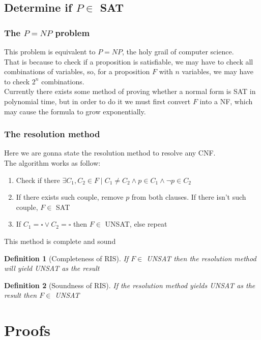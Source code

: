\documentclass{report}
\newtheorem{definition}{Definition}[section]
\begin{document}
    \section{Determine if $P \in$ SAT}
        \subsection{The $P = NP$ problem}
            This problem is equivalent to $P = NP$, the holy grail of computer science. \\
            That is because to check if a proposition is satisfiable, we may have to check 
            all combinations of variables, so, for a proposition $F$ with $n$ variables, we 
            may have to check $2^n$ combinations. \\
            Currently there exists some method of proving whether a normal form is SAT in 
            polynomial time, but in order to do it we must first convert $F$ into a NF, 
            which may cause the formula to grow exponentially.
        \subsection{The resolution method}
            Here we are gonna state the resolution method to resolve any CNF. \\
            The algorithm works as follow:
            \begin{enumerate}
                \item Check if there $\exists C_1, C_2 \in F \mid C_1 \neq C_2 \land p \in C_1 \land \neg p \in C_2$
                \item If there exists such couple, remove $p$ from both clauses. If there isn't such couple, $F \in$ SAT 
                \item If $C_1 = \square \lor C_2 = \square$ then $F \in$ UNSAT, else repeat
            \end{enumerate}
            This method is complete and sound
            \begin{definition}[Completeness of RIS] 
                If $F \in$ UNSAT then the resolution method will yield UNSAT as the result
            \end{definition}
            \begin{definition}[Soundness of RIS]
                If the resolution method yields UNSAT as the result then $F \in$ UNSAT
            \end{definition}
\chapter{Proofs}
\end{document}
